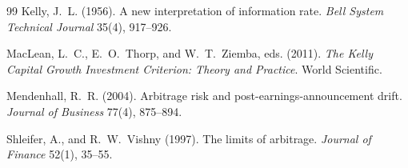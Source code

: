 \documentclass[11pt]{article}
\theoremstyle{definition}
\newcommand{\1}{\mathbf{1}}
\begin{document}
\begin{thebibliography}{99}
Kelly, J.~L. (1956). A new interpretation of information rate. \textit{Bell System
Technical Journal} 35(4), 917--926.

MacLean, L.~C., E.~O.~Thorp, and W.~T.~Ziemba, eds. (2011). \textit{The Kelly Capital Growth
Investment Criterion: Theory and Practice}. World Scientific.

Mendenhall, R.~R. (2004). Arbitrage risk and post-earnings-announcement drift.
\textit{Journal of Business} 77(4), 875--894.

Shleifer, A., and R.~W.~Vishny (1997). The limits of arbitrage. \textit{Journal of
Finance} 52(1), 35--55.
\end{thebibliography}
\end{document}
